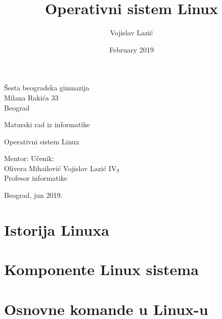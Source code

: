 \documentclass[12pt,twoside,a4paper]{article}
\title{Operativni sistem Linux}
\author{Vojislav Lazić}
\date{February 2019}
\begin{document}
    \thispagestyle{empty}
    \noindent
    Šesta beogradska gimnazija\\
    Milana Rakića 33\\
    Beograd
    \vfill
    \begin{center}
        \begin{Large}
        Maturski rad iz informatike\\
        \bigskip 
        \end{Large}
        {\Huge
        Operativni sistem Linux}
    \end{center}
    \vfill
    \noindent Mentor: \hfill Učenik:\\
    Olivera Mihailović \hfill Vojislav Lazić IV$_{9}$\\
    Profesor informatike
    \vfill
    \begin{center}
        Beograd, jun 2019.
    \end{center}
\thispagestyle{empty}
\newpage
\renewcommand{\contentsname}{Sadržaj}
\tableofcontents
\newpage
\section{Istorija Linuxa}

\section{Komponente Linux sistema}

\section{Osnovne komande u Linux-u}

\nocite{linfo}
\renewcommand\refname{Literatura}



\end{document}
